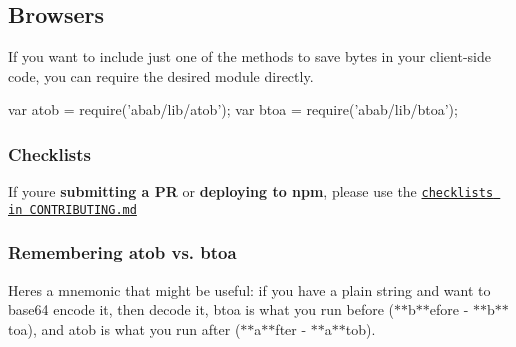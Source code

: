 \subsection*{Browsers}

If you want to include just one of the methods to save bytes in your client-\/side code, you can {\ttfamily require} the desired module directly.


\begin{DoxyCode}
var atob = require('abab/lib/atob');
var btoa = require('abab/lib/btoa');
\end{DoxyCode}
 



\subsubsection*{Checklists}

If you\textquotesingle{}re {\bfseries submitting a PR} or {\bfseries deploying to npm}, please use the \href{https://github.com/jsdom/abab/blob/master/CONTRIBUTING.md#checklists}{\tt checklists in C\+O\+N\+T\+R\+I\+B\+U\+T\+I\+N\+G.\+md}

\subsubsection*{Remembering {\ttfamily atob} vs. {\ttfamily btoa}}

Here\textquotesingle{}s a mnemonic that might be useful\+: if you have a plain string and want to base64 encode it, then decode it, {\ttfamily btoa} is what you run before ($\ast$$\ast$b$\ast$$\ast$efore -\/ $\ast$$\ast$b$\ast$$\ast$toa), and {\ttfamily atob} is what you run after ($\ast$$\ast$a$\ast$$\ast$fter -\/ $\ast$$\ast$a$\ast$$\ast$tob). 